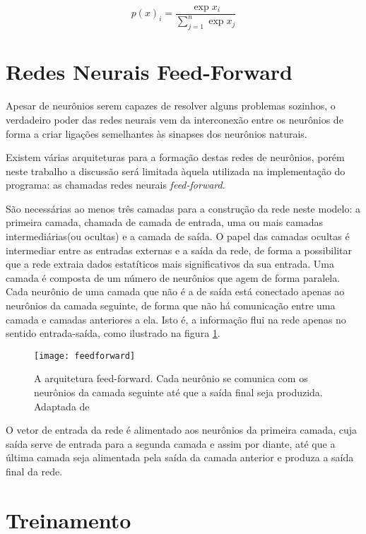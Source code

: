 \begin{equation}
p(x)_i = \frac{\exp{x_i}}{\sum_{j=1}^n\exp{x_j}}
\label{eq:softmax}
\end{equation}




\section{Redes Neurais Feed-Forward}

Apesar de neurônios serem capazes de resolver alguns problemas sozinhos, o verdadeiro poder das redes neurais vem da interconexão entre os neurônios de forma a criar ligações semelhantes às sinapses dos neurônios naturais.

Existem várias arquiteturas para a formação destas redes de neurônios, porém neste trabalho a discussão será limitada àquela utilizada na implementação do programa: as chamadas redes neurais \textit{feed-forward}.

São necessárias ao menos três camadas para a construção da rede neste modelo: a primeira camada, chamada de camada de entrada, uma ou mais camadas intermediárias(ou ocultas) e a camada de saída. O papel das camadas ocultas é intermediar entre as entradas externas e a saída da rede, de forma a possibilitar que a rede extraia dados estatíticos mais significativos da sua entrada.  Uma camada é composta de um número de neurônios que agem de forma paralela. Cada neurônio de uma camada que não é a de saída está conectado apenas ao neurônios da camada seguinte, de forma que não há comunicação entre uma camada e camadas anteriores a ela. Isto é, a informação flui na rede apenas no sentido entrada-saída, como ilustrado na figura \ref{fig:feedfoward}.

\begin{figure}
\centering
\texttt{[image: feedforward]}
\label{fig:feedfoward}
\caption{A arquitetura feed-forward. Cada neurônio se comunica com os neurônios da camada seguinte até que a saída final seja produzida. Adaptada de \cite{Haykin}}
\end{figure}

O vetor de entrada da rede é alimentado aos neurônios da primeira camada, cuja saída serve de entrada para a segunda camada e assim por diante, até que a última camada seja alimentada pela saída da camada anterior e produza a saída final da rede. 

\section{Treinamento}

